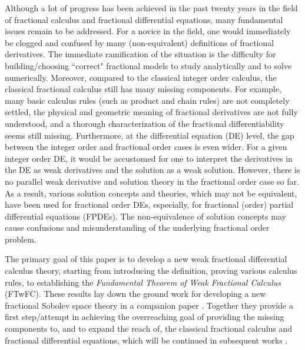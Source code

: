 \documentclass[leqno,final]{siamltex}
\numberwithin{equation}{section}
\renewcommand{\(}{\bigl(}
\renewcommand{\)}{\bigr)}
\begin{document}
    Although a lot of progress has been achieved in the past twenty years in the field of fractional calculus and fractional differential equations, many fundamental issues remain to be addressed. For a novice in the field, one would immediately be clogged and confused by many (non-equivalent) definitions of fractional derivatives. The immediate ramification of the situation is the difficulty for building/choosing ``correct" fractional models to study analytically and to solve numerically. Moreover, compared to the classical integer order calculus, the classical fractional calculus still has many missing components. For example, many basic calculus rules (such as product and chain rules) are not completely settled, the physical and geometric meaning of fractional derivatives are not fully understood, and a thorough characterization of the fractional differentiability seems still missing. Furthermore, at the differential equation (DE) level, the gap between the integer order and fractional order cases is even wider. For a given integer order DE, it would be accustomed for one to interpret the derivatives in the DE as weak derivatives and the solution as a weak solution. However, there is no parallel weak derivative and solution theory in the fractional order case so far. As a result, various solution concepts and theories, which may not be equivalent, have been used for fractional order DEs, especially, for fractional (order) partial differential equations (FPDEs). The non-equivalence of solution concepts may cause confusions and misunderstanding of the underlying fractional order problem.
 
    The primary goal of this paper is to develop a new weak fractional differential calculus theory, starting from introducing the definition, proving various 
    calculus rules, to establishing the {\em Fundamental Theorem of Weak Fractional Calculus} (FTwFC).
    These results lay down the ground work for developing a new fractional Sobolev space theory
    in a companion paper \cite{Feng_Sutton1a}. 
    Together they provide a first step/attempt in achieving the overreaching goal of providing the missing components to, and to expand the reach of, the classical fractional calculus and fractional differential equations, which will be continued in subsequent works \cite{Feng_Sutton2,Feng_Sutton3}. 
 
\end{document}
